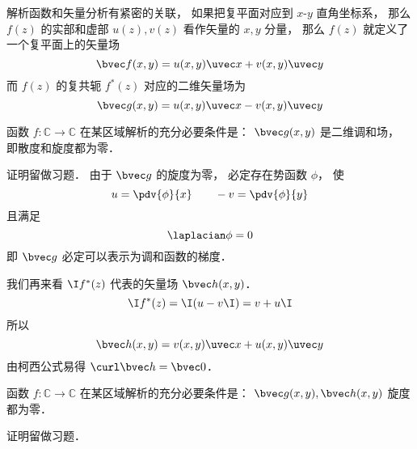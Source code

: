 

解析函数和矢量分析有紧密的关联， 如果把复平面对应到 $x$-$y$ 直角坐标系， 那么 $f(z)$ 的实部和虚部 $u(z), v(z)$ 看作矢量的 $x,y$ 分量， 那么 $f(z)$ 就定义了一个复平面上的矢量场
\begin{equation}
\bvec f(x,y) = u(x,y)\uvec x + v(x,y)\uvec y
\end{equation}
而 $f(z)$ 的复共轭 $f^*(z)$ 对应的二维矢量场为
\begin{equation}
\bvec g(x,y) = u(x,y)\uvec x - v(x,y)\uvec y
\end{equation}

\begin{theorem}{}
函数 $f:\mathbb C\to\mathbb C$ 在某区域解析的充分必要条件是： $\bvec g(x,y)$ 是二维调和场， 即散度和旋度都为零．
\end{theorem}
证明留做习题． 由于 $\bvec g$ 的旋度为零， 必定存在势函数 $\phi$， 使
\begin{equation}
u = \pdv{\phi}{x} \qquad -v = \pdv{\phi}{y}
\end{equation}
且满足
\begin{equation}
\laplacian \phi = 0
\end{equation}
即 $\bvec g$ 必定可以表示为调和函数的梯度．

我们再来看 $\I f^*(z)$ 代表的矢量场 $\bvec h(x,y)$．
\begin{equation}
\I f^*(z) = \I (u - v\I) = v + u\I
\end{equation}
所以
\begin{equation}
\bvec h(x,y) = v(x,y)\uvec x + u(x,y)\uvec y
\end{equation}
由柯西公式易得 $\curl \bvec h = \bvec 0$．

\begin{theorem}{}
函数 $f:\mathbb C\to\mathbb C$ 在某区域解析的充分必要条件是： $\bvec g(x,y), \bvec h(x,y)$ 旋度都为零．
\end{theorem}
证明留做习题．
